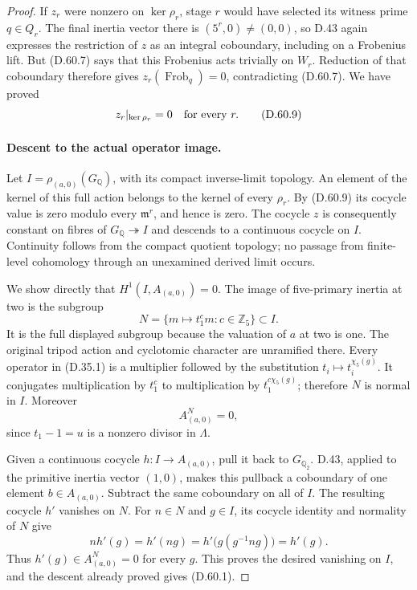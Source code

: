 \begin{proof}
If \(z_r\) were nonzero on \(\ker\rho_r\), stage \(r\)
would have selected its witness prime \(q\in Q_r\).
The final inertia vector there is \((5^r,0)\ne(0,0)\),
so D.43 again expresses the restriction of \(z\) as an
integral coboundary, including on a Frobenius lift.
But (D.60.7) says that this Frobenius acts trivially on
\(W_r\). Reduction of that coboundary therefore gives
\(z_r(\operatorname{Frob}_q)=0\), contradicting
(D.60.7). We have proved
\[
                         z_r|_{\ker\rho_r}=0
                         \quad\hbox{for every }r.
                                                        \tag{D.60.9}
\]

\paragraph{Descent to the actual operator image.}
Let \(I=\rho_{(a,0)}(G_{\mathbb Q})\), with its compact
inverse-limit topology. An element of the kernel of this
full action belongs to the kernel of every \(\rho_r\).
By (D.60.9) its cocycle value is zero modulo every
\(\mathfrak m^r\), and hence is zero. The cocycle \(z\)
is consequently constant on fibres of
\(G_{\mathbb Q}\twoheadrightarrow I\) and descends to a
continuous cocycle on \(I\). Continuity follows from the
compact quotient topology; no passage from finite-level
cohomology through an unexamined derived limit occurs.

We show directly that \(H^1(I,A_{(a,0)})=0\).
The image of five-primary inertia at two is the subgroup
\[
 N=\{m\longmapsto t_1^c m:c\in\mathbb Z_5\}\subset I.
                                                        \tag{D.60.10}
\]
It is the full displayed subgroup because the valuation of
\(a\) at two is one. The original tripod action and
cyclotomic character are unramified there. Every operator
in (D.35.1) is a multiplier followed by the substitution
\(t_i\mapsto t_i^{\chi_5(g)}\). It conjugates multiplication
by \(t_1^c\) to multiplication by
\(t_1^{c\chi_5(g)}\); therefore \(N\) is normal in \(I\).
Moreover
\[
                         A_{(a,0)}^N=0,
                                                        \tag{D.60.11}
\]
since \(t_1-1=u\) is a nonzero divisor in \(\Lambda\).

Given a continuous cocycle \(h:I\to A_{(a,0)}\), pull it
back to \(G_{\mathbb Q_2}\). D.43, applied to the primitive
inertia vector \((1,0)\), makes this pullback a coboundary
of one element \(b\in A_{(a,0)}\). Subtract the same
coboundary on all of \(I\). The resulting cocycle \(h'\)
vanishes on \(N\). For \(n\in N\) and \(g\in I\), its
cocycle identity and normality of \(N\) give
\[
 n h'(g)=h'(ng)
        =h'\bigl(g(g^{-1}ng)\bigr)=h'(g).
\]
Thus \(h'(g)\in A_{(a,0)}^N=0\) for every \(g\).
This proves the desired vanishing on \(I\), and the descent
already proved gives (D.60.1).


\end{proof}
